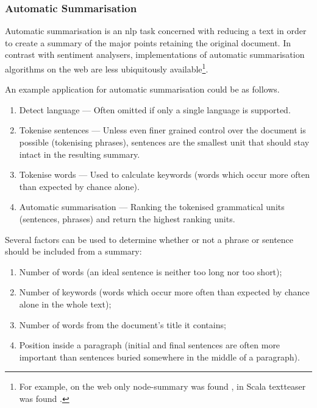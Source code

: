 \subsubsection{Automatic Summarisation}\label{automatic-summarisation}

Automatic summarisation is an \gls{nlp} task concerned with reducing a
text in order to create a summary of the major points retaining the
original document. In contrast with sentiment analysers, implementations
of automatic summarisation algorithms on the web are less ubiquitously
available\footnote{For example, on the web only node-summary was found
  \autocite{jbrooksuk/node-summary-source-code}, in Scala textteaser was found
  \autocite{MojoJolo/textteaser-source-code}.}.

An example application for automatic summarisation could be as follows.

\begin{enumerate}
\def\labelenumi{\arabic{enumi}.}
\itemsep1pt\parskip0pt
\item
  Detect language --- Often omitted if only a single language is
  supported.
\item
  Tokenise sentences --- Unless even finer grained control over the
  document is possible (tokenising phrases), sentences are the smallest
  unit that should stay intact in the resulting summary.
\item
  Tokenise words --- Used to calculate keywords (words which occur more
  often than expected by chance alone).
\item
  Automatic summarisation --- Ranking the tokenised grammatical units
  (sentences, phrases) and return the highest ranking units.
\end{enumerate}

Several factors can be used to determine whether or not a phrase or
sentence should be included from a summary:

\begin{enumerate}
\def\labelenumi{\arabic{enumi}.}
\itemsep1pt\parskip0pt
\item
  Number of words (an ideal sentence is neither too long nor too short);
\item
  Number of keywords (words which occur more often than expected by
  chance alone in the whole text);
\item
  Number of words from the document's title it contains;
\item
  Position inside a paragraph (initial and final sentences are often
  more important than sentences buried somewhere in the middle of a
  paragraph).
\end{enumerate}


